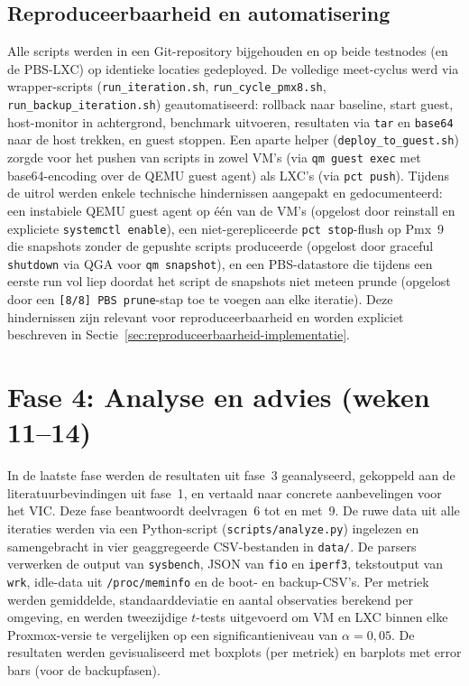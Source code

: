 \subsection{Reproduceerbaarheid en automatisering}
Alle scripts werden in een Git-repository bijgehouden en op beide testnodes (en de PBS-LXC) op identieke locaties gedeployed. De volledige meet-cyclus werd via wrapper-scripts (\texttt{run\_iteration.sh}, \texttt{run\_cycle\_pmx8.sh}, \texttt{run\_backup\_iteration.sh}) geautomatiseerd: rollback naar baseline, start guest, host-monitor in achtergrond, benchmark uitvoeren, resultaten via \texttt{tar} en \texttt{base64} naar de host trekken, en guest stoppen. Een aparte helper (\texttt{deploy\_to\_guest.sh}) zorgde voor het pushen van scripts in zowel VM's (via \texttt{qm guest exec} met base64-encoding over de QEMU guest agent) als LXC's (via \texttt{pct push}). Tijdens de uitrol werden enkele technische hindernissen aangepakt en gedocumenteerd: een instabiele QEMU guest agent op één van de VM's (opgelost door reinstall en expliciete \texttt{systemctl enable}), een niet-gerepliceerde \texttt{pct stop}-flush op Pmx~9 die snapshots zonder de gepushte scripts produceerde (opgelost door graceful \texttt{shutdown} via QGA voor \texttt{qm snapshot}), en een PBS-datastore die tijdens een eerste run vol liep doordat het script de snapshots niet meteen prunde (opgelost door een \texttt{[8/8] PBS prune}-stap toe te voegen aan elke iteratie). Deze hindernissen zijn relevant voor reproduceerbaarheid en worden expliciet beschreven in Sectie~\ref{sec:reproduceerbaarheid-implementatie}.

\section{Fase 4: Analyse en advies (weken 11--14)}
\label{sec:fase4-analyse}

In de laatste fase werden de resultaten uit fase~3 geanalyseerd, gekoppeld aan de literatuurbevindingen uit fase~1, en vertaald naar concrete aanbevelingen voor het VIC. Deze fase beantwoordt deelvragen~6 tot en met~9. De ruwe data uit alle iteraties werden via een Python-script (\texttt{scripts/analyze.py}) ingelezen en samengebracht in vier geaggregeerde CSV-bestanden in \texttt{data/}. De parsers verwerken de output van \texttt{sysbench}, JSON van \texttt{fio} en \texttt{iperf3}, tekstoutput van \texttt{wrk}, idle-data uit \texttt{/proc/meminfo} en de boot- en backup-CSV's. Per metriek werden gemiddelde, standaarddeviatie en aantal observaties berekend per omgeving, en werden tweezijdige $t$-tests uitgevoerd om VM en LXC binnen elke Proxmox-versie te vergelijken op een significantieniveau van $\alpha = 0,05$. De resultaten werden gevisualiseerd met boxplots (per metriek) en barplots met error bars (voor de backupfasen).

